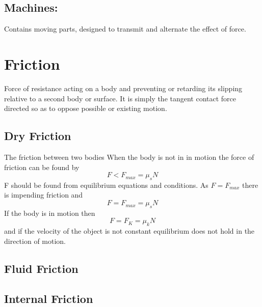 \documentclass[14pt]{article}
\begin{document}
    \subsection{Machines:}
    Contains moving parts, designed to transmit and alternate the effect of force.
    \section{Friction}
    Force of resistance acting on a body and preventing or retarding its slipping relative to a second body or surface. It is simply the tangent contact force directed so as to oppose possible or existing motion.
    \subsection{Dry Friction}
    The friction between two bodies
    When the body is not in in motion the force of friction can be found by
    $$F<F_{max}=\mu_sN$$
    F should be found from equilibrium equations and conditions. 
    As $F=F_{max}$ there is impending friction and $$F=F_{max}=\mu_sN$$
    If the body is in motion then 
    $$F=F_K=\mu_kN$$
    and if the velocity of the object is not constant equilibrium does not hold in the direction of motion.
    \subsection{Fluid Friction}
    \subsection{Internal Friction}
\end{document}
